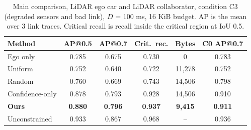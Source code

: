\begin{table}[t]\caption{Main comparison, LiDAR ego car and LiDAR collaborator, condition C3 (degraded sensors and bad link), $D$ = 100 ms, 16 KiB budget. AP is the mean over 3 link traces. Critical recall is recall inside the critical region at IoU 0.5.}\label{tab:main}
\centering\scriptsize\setlength{\tabcolsep}{2.6pt}\begin{tabular}{lccccc}\toprule
Method & AP@0.5 & AP@0.7 & Crit.\ rec. & Bytes & C0 AP@0.7\\\midrule
Ego only & 0.785 & 0.675 & 0.730 & 0 & 0.783\\
Uniform & 0.752 & 0.640 & 0.722 & 11,278 & 0.752\\
Random & 0.760 & 0.669 & 0.743 & 14,506 & 0.798\\
Confidence-only & 0.878 & 0.793 & 0.928 & 14,506 & 0.910\\
\textbf{Ours} & \textbf{0.880} & \textbf{0.796} & \textbf{0.937} & \textbf{9,415} & \textbf{0.911}\\
Unconstrained & 0.933 & 0.867 & 0.968 & -- & 0.936\\
\bottomrule\end{tabular}\end{table}
